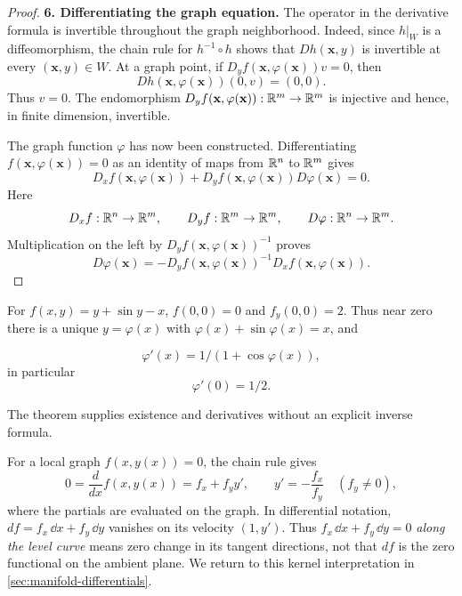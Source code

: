\begin{proof}
\noindent\textbf{6. Differentiating the graph equation.}
The operator in the derivative formula is invertible throughout the graph
neighborhood. Indeed, since $h|_W$ is a diffeomorphism, the chain rule for
$h^{-1}\circ h$
shows that $Dh(\mathbf{x},y)$ is invertible at every $(\mathbf{x},y)\in W$. At a graph
point, if $D_yf(\mathbf{x},\varphi(\mathbf{x}))v=0$, then
\[
Dh(\mathbf{x},\varphi(\mathbf{x}))(0,v)=(0,0).
\]
Thus $v=0$. The endomorphism
$D_yf(\mathbf{x},\varphi(\mathbf{x})):\mathbb{R}^m\to\mathbb{R}^m$ is injective and hence, in finite
dimension, invertible.

The graph function $\varphi$ has now been constructed. Differentiating
$f(\mathbf{x},\varphi(\mathbf{x}))=0$ as an identity of maps from $\mathbb{R}^n$ to $\mathbb{R}^m$ gives
\[
D_xf(\mathbf{x},\varphi(\mathbf{x}))
+D_yf(\mathbf{x},\varphi(\mathbf{x}))D\varphi(\mathbf{x})=0.
\]
Here
\[
D_xf:\mathbb{R}^n\to\mathbb{R}^m,\qquad
D_yf:\mathbb{R}^m\to\mathbb{R}^m,\qquad
D\varphi:\mathbb{R}^n\to\mathbb{R}^m.
\]
Multiplication on the left by $D_yf(\mathbf{x},\varphi(\mathbf{x}))^{-1}$ proves
\[
D\varphi(\mathbf{x})
=-D_yf(\mathbf{x},\varphi(\mathbf{x}))^{-1}D_xf(\mathbf{x},\varphi(\mathbf{x})).
\]
\end{proof}
\begin{example}
For $f(x,y)=y+\sin y-x$, $f(0,0)=0$ and $f_y(0,0)=2$.
Thus near zero there is a unique $y=\varphi(x)$ with
$\varphi(x)+\sin\varphi(x)=x$, and

\[
\varphi'(x)=1/(1+\cos\varphi(x)),
\]
 in particular
\[
\varphi'(0)=1/2.
\]

The theorem supplies existence and derivatives without an explicit inverse formula.
\end{example}




For a local graph $f(x,y(x))=0$, the chain rule gives
\[
0=\frac{d}{dx}f(x,y(x))=f_x+f_y y',\qquad
y'=-\frac{f_x}{f_y}\quad(f_y\ne0),
\]
where the partials are evaluated on the graph. In differential notation,
$df=f_x\,\dd x+f_y\,\dd y$ vanishes on its velocity $(1,y')$.
Thus $f_x\,\dd x+f_y\,\dd y=0$ \emph{along the level curve}
means zero change in its tangent directions, not that $df$ is the zero
functional on the ambient plane. We return to this kernel interpretation in
\cref{sec:manifold-differentials}.

